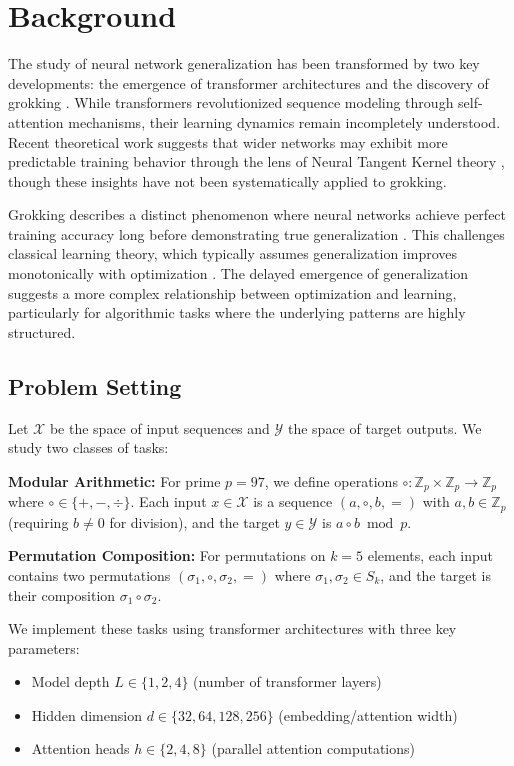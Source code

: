 \documentclass{article} %
\begin{document}
\section{Background}
\label{sec:background}

The study of neural network generalization has been transformed by two key developments: the emergence of transformer architectures \citep{vaswani2017attention} and the discovery of grokking \citep{power2022grokking}. While transformers revolutionized sequence modeling through self-attention mechanisms, their learning dynamics remain incompletely understood. Recent theoretical work suggests that wider networks may exhibit more predictable training behavior through the lens of Neural Tangent Kernel theory \citep{Jacot2018NeuralTK, Lee2019WideNN}, though these insights have not been systematically applied to grokking.

Grokking describes a distinct phenomenon where neural networks achieve perfect training accuracy long before demonstrating true generalization \citep{power2022grokking}. This challenges classical learning theory, which typically assumes generalization improves monotonically with optimization \citep{Zhang2016UnderstandingDL}. The delayed emergence of generalization suggests a more complex relationship between optimization and learning, particularly for algorithmic tasks where the underlying patterns are highly structured.

\subsection{Problem Setting}
Let $\mathcal{X}$ be the space of input sequences and $\mathcal{Y}$ the space of target outputs. We study two classes of tasks:

\textbf{Modular Arithmetic:} For prime $p=97$, we define operations $\circ: \mathbb{Z}_p \times \mathbb{Z}_p \rightarrow \mathbb{Z}_p$ where $\circ \in \{+, -, \div\}$. Each input $x \in \mathcal{X}$ is a sequence $(a, \circ, b, =)$ with $a,b \in \mathbb{Z}_p$ (requiring $b \neq 0$ for division), and the target $y \in \mathcal{Y}$ is $a \circ b \bmod p$.

\textbf{Permutation Composition:} For permutations on $k=5$ elements, each input contains two permutations $(\sigma_1, \circ, \sigma_2, =)$ where $\sigma_1, \sigma_2 \in S_k$, and the target is their composition $\sigma_1 \circ \sigma_2$.

We implement these tasks using transformer architectures with three key parameters:
\begin{itemize}
    \item Model depth $L \in \{1,2,4\}$ (number of transformer layers)
    \item Hidden dimension $d \in \{32,64,128,256\}$ (embedding/attention width)
    \item Attention heads $h \in \{2,4,8\}$ (parallel attention computations)
\end{itemize}
\end{document}
